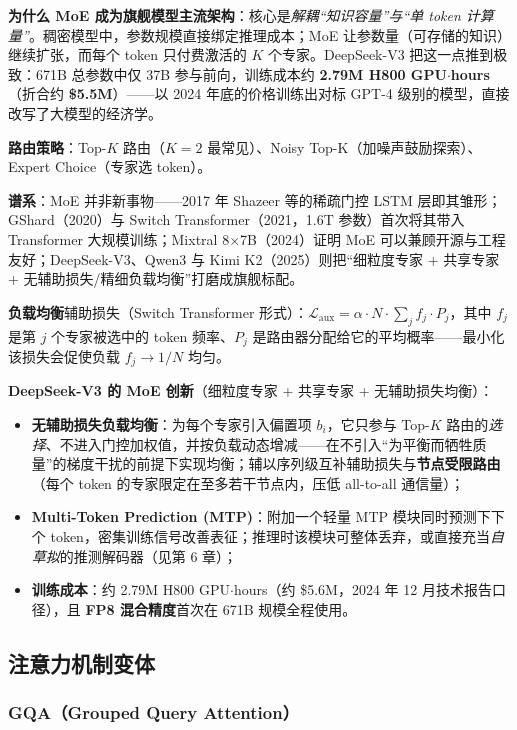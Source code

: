 \documentclass[12pt,a4paper]{article}
\begin{document}
\textbf{为什么 MoE 成为旗舰模型主流架构}：核心是\emph{解耦“知识容量”与“单 token 计算量”}。稠密模型中，参数规模直接绑定推理成本；MoE 让参数量（可存储的知识）继续扩张，而每个 token 只付费激活的 $K$ 个专家。DeepSeek-V3 把这一点推到极致：671B 总参数中仅 37B 参与前向，训练成本约 \textbf{2.79M H800 GPU$\cdot$hours}（折合约 \textbf{\$5.5M}）——以 2024 年底的价格训练出对标 GPT-4 级别的模型，直接改写了大模型的经济学。

\textbf{路由策略}：Top-$K$ 路由（$K=2$ 最常见）、Noisy Top-K（加噪声鼓励探索）、Expert Choice（专家选 token）。

\textbf{谱系}：MoE 并非新事物——2017 年 Shazeer 等的稀疏门控 LSTM 层即其雏形；GShard（2020）与 Switch Transformer（2021，1.6T 参数）首次将其带入 Transformer 大规模训练；Mixtral 8$\times$7B（2024）证明 MoE 可以兼顾开源与工程友好；DeepSeek-V3、Qwen3 与 Kimi K2（2025）则把“细粒度专家 + 共享专家 + 无辅助损失/精细负载均衡”打磨成旗舰标配。

\textbf{负载均衡}辅助损失（Switch Transformer 形式）：$\mathcal{L}_{\text{aux}} = \alpha \cdot N \cdot \sum_{j} f_j \cdot P_j$，其中 $f_j$ 是第 $j$ 个专家被选中的 token 频率、$P_j$ 是路由器分配给它的平均概率——最小化该损失会促使负载 $f_j \to 1/N$ 均匀。

\textbf{DeepSeek-V3 的 MoE 创新}（细粒度专家 + 共享专家 + 无辅助损失均衡）：
\begin{itemize}
  \item \textbf{无辅助损失负载均衡}：为每个专家引入偏置项 $b_i$，它只参与 Top-$K$ 路由的\emph{选择}、不进入门控加权值，并按负载动态增减——在不引入“为平衡而牺牲质量”的梯度干扰的前提下实现均衡；辅以序列级互补辅助损失与\textbf{节点受限路由}（每个 token 的专家限定在至多若干节点内，压低 all-to-all 通信量）；
  \item \textbf{Multi-Token Prediction (MTP)}：附加一个轻量 MTP 模块同时预测下下个 token，密集训练信号改善表征；推理时该模块可整体丢弃，或直接充当\emph{自草拟}的推测解码器（见第 6 章）；
  \item \textbf{训练成本}：约 2.79M H800 GPU$\cdot$hours（约 \$5.6M，2024 年 12 月技术报告口径），且 \textbf{FP8 混合精度}首次在 671B 规模全程使用。
\end{itemize}

\subsection{注意力机制变体}

\subsubsection{GQA（Grouped Query Attention）}
\end{document}
